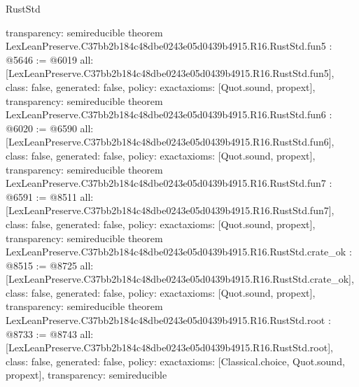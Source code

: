 \begin{lexlean}{RustStd}
\begin{coremodule}
{  transparency: semireducible
}
theorem LexLeanPreserve.C37bb2b184c48dbe0243e05d0439b4915.R16.RustStd.fun5 : @5646 := @6019 {
  all: [LexLeanPreserve.C37bb2b184c48dbe0243e05d0439b4915.R16.RustStd.fun5],
  class: false,
  generated: false,
  policy: exact{axioms: [Quot.sound, propext]},
  transparency: semireducible
}
theorem LexLeanPreserve.C37bb2b184c48dbe0243e05d0439b4915.R16.RustStd.fun6 : @6020 := @6590 {
  all: [LexLeanPreserve.C37bb2b184c48dbe0243e05d0439b4915.R16.RustStd.fun6],
  class: false,
  generated: false,
  policy: exact{axioms: [Quot.sound, propext]},
  transparency: semireducible
}
theorem LexLeanPreserve.C37bb2b184c48dbe0243e05d0439b4915.R16.RustStd.fun7 : @6591 := @8511 {
  all: [LexLeanPreserve.C37bb2b184c48dbe0243e05d0439b4915.R16.RustStd.fun7],
  class: false,
  generated: false,
  policy: exact{axioms: [Quot.sound, propext]},
  transparency: semireducible
}
theorem LexLeanPreserve.C37bb2b184c48dbe0243e05d0439b4915.R16.RustStd.crate_ok : @8515 := @8725 {
  all: [LexLeanPreserve.C37bb2b184c48dbe0243e05d0439b4915.R16.RustStd.crate_ok],
  class: false,
  generated: false,
  policy: exact{axioms: [Quot.sound, propext]},
  transparency: semireducible
}
theorem LexLeanPreserve.C37bb2b184c48dbe0243e05d0439b4915.R16.RustStd.root : @8733 := @8743 {
  all: [LexLeanPreserve.C37bb2b184c48dbe0243e05d0439b4915.R16.RustStd.root],
  class: false,
  generated: false,
  policy: exact{axioms: [Classical.choice, Quot.sound, propext]},
  transparency: semireducible
}


\end{coremodule}
\end{lexlean}

